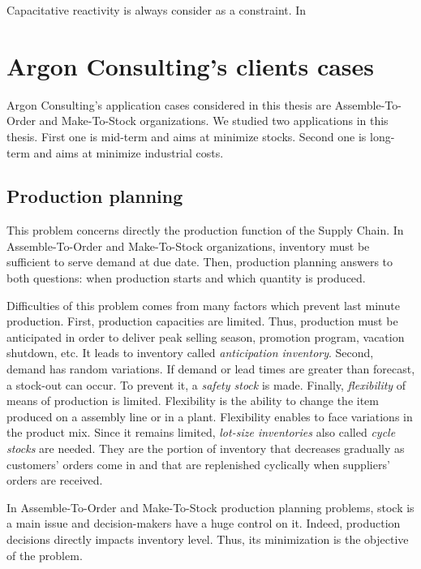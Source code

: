 Capacitative reactivity is always consider as a constraint.
In



\section{Argon Consulting's clients cases}


Argon Consulting's application cases considered in this thesis are Assemble-To-Order and Make-To-Stock organizations.
We studied two applications in this thesis.
First one is mid-term and aims at minimize stocks.
Second one is long-term and aims at minimize industrial costs.


\subsection{Production planning}
\label{sec:business-context:argon:pdp}


This problem concerns directly the production function of the Supply Chain.
In Assemble-To-Order and Make-To-Stock organizations, inventory must be sufficient to serve demand at due date.
Then, production planning answers to both questions: when production starts and which quantity is produced.

Difficulties of this problem comes from many factors which prevent last minute production.
First, production capacities are limited.
Thus, production must be anticipated in order to deliver peak selling season, promotion program, vacation shutdown, etc.
It leads to inventory called \emph{anticipation inventory}.
Second, demand has random variations.
If demand or lead times are greater than forecast, a stock-out can occur.
To prevent it, a \emph{safety stock} is made.
Finally, \emph{flexibility} of means of production is limited.
Flexibility is the ability to change the item produced on a assembly line or in a plant.
Flexibility enables to face variations in the product mix.
Since it remains limited, \emph{lot-size inventories} also called \emph{cycle stocks} are needed. They are the portion of inventory that decreases gradually as customers’ orders come in and that are replenished cyclically when suppliers’ orders are received.


In Assemble-To-Order and Make-To-Stock production planning problems, stock is a main issue and decision-makers have a huge control on it.
Indeed, production decisions directly impacts inventory level.
Thus, its minimization is the objective of the problem.


